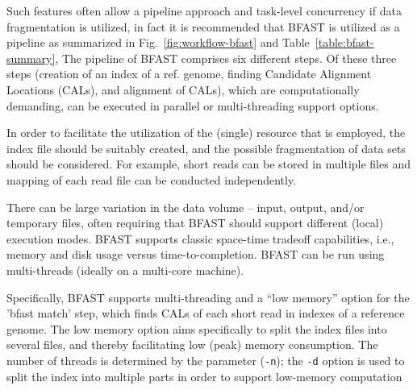 \documentclass{cpeauth}
\begin{document}


Such features often allow a pipeline approach and task-level
concurrency if data fragmentation is utilized, in fact it is
recommended that BFAST is utilized as a pipeline as summarized in
Fig.~\ref{fig:workflow-bfast} and Table~\ref{table:bfast-summary}, The
pipeline of BFAST comprises six different steps. Of these three steps
(creation of an index of a ref. genome, finding Candidate Alignment
Locations (CALs), and alignment of CALs), which are computationally
demanding, can be executed in parallel or multi-threading support
options.
 
In order to facilitate the utilization of the (single) resource that
is employed, the index file should be suitably created, and the
possible fragmentation of data sets should be considered.  For
example, short reads can be stored in multiple files and mapping of
each read file can be conducted independently.
 
There can be large variation in the data volume -- input, output,
and/or temporary files, often requiring that BFAST should support
different (local) execution modes.  BFAST supports classic space-time
tradeoff capabilities, i.e., memory and disk usage versus
time-to-completion. BFAST can be run using multi-threads (ideally
on a multi-core machine).

Specifically, BFAST supports multi-threading and a ``low memory''
option for the 'bfast match' step, which finds CALs of each short read in
indexes of a reference genome.  The low memory option aims specifically to
split the index files into several files, and thereby facilitating low
(peak) memory consumption.  The number of threads is determined by the
parameter (\texttt{-n}); the \texttt{-d} option is used to split the
index into multiple parts in order to support low-memory computation

\end{document}
